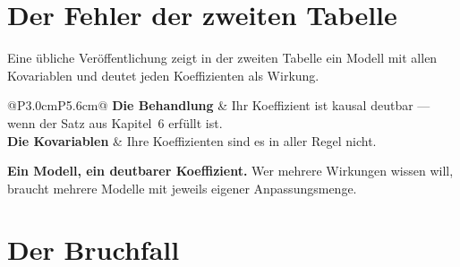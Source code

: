 \section{Der Fehler der zweiten Tabelle}

\begin{merksatz}
Eine übliche Veröffentlichung zeigt in der zweiten Tabelle ein Modell mit allen Kovariablen und deutet jeden Koeffizienten als Wirkung.

\begin{center}
{\small
\renewcommand{\arraystretch}{1.5}
\begin{tabular}{@{}P{3.0cm}P{5.6cm}@{}}
\toprule
\textbf{Die Behandlung} & Ihr Koeffizient ist kausal deutbar --- wenn der Satz aus Kapitel~6 erfüllt ist.\\
\textbf{Die Kovariablen} & Ihre Koeffizienten sind es in aller Regel \textcolor{akzent}{nicht}.\\
\bottomrule
\end{tabular}}
\end{center}

\begin{center}
\begin{minipage}{0.88\textwidth}
\end{minipage}
\end{center}

\begin{center}
\begin{minipage}{0.9\textwidth}
\textbf{Ein Modell, ein deutbarer Koeffizient.} Wer mehrere Wirkungen wissen will, braucht mehrere Modelle mit jeweils eigener Anpassungsmenge.
\end{minipage}
\end{center}
\end{merksatz}

\section{Der Bruchfall}

